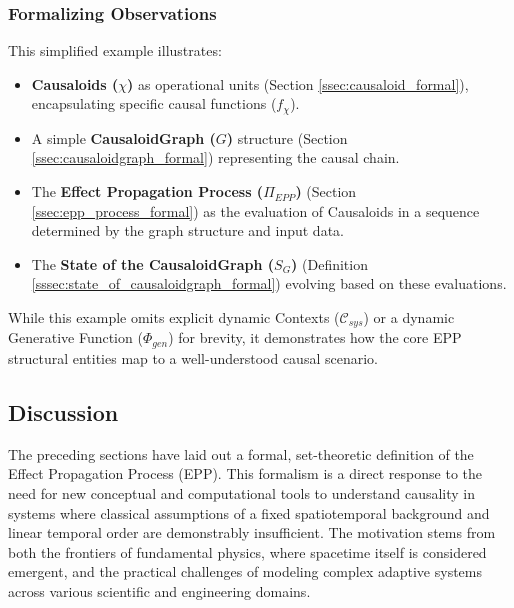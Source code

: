     \subsubsection{Formalizing Observations}
    \label{ssec:example_observations_connection}
    This simplified example illustrates:
    \begin{itemize}
        \item \textbf{Causaloids (\(\chi\))} as operational units (Section \ref{ssec:causaloid_formal}), encapsulating specific causal functions (\(f_\chi\)).
        \item A simple \textbf{CausaloidGraph (\(G\))} structure (Section \ref{ssec:causaloidgraph_formal}) representing the causal chain.
        \item The \textbf{Effect Propagation Process (\(\Pi_{EPP}\))} (Section \ref{ssec:epp_process_formal}) as the evaluation of Causaloids in a sequence determined by the graph structure and input data.
        \item The \textbf{State of the CausaloidGraph (\(S_G\))} (Definition \ref{sssec:state_of_causaloidgraph_formal}) evolving based on these evaluations.
    \end{itemize}
    While this example omits explicit dynamic Contexts (\(\mathcal{C}_{sys}\)) or a dynamic Generative Function (\(\Phi_{gen}\)) for brevity, it demonstrates how the core EPP structural entities map to a well-understood causal scenario.
    
    
\subsection[Discussion]{Discussion} 
\label{sec:formalization_example_discussion}

The preceding sections have laid out a formal, set-theoretic definition of the Effect Propagation Process (EPP). This formalism is a direct response to the need for new conceptual and computational tools to understand causality in systems where classical assumptions of a fixed spatiotemporal background and linear temporal order are demonstrably insufficient. The motivation stems from both the frontiers of fundamental physics, where spacetime itself is considered emergent, and the practical challenges of modeling complex adaptive systems across various scientific and engineering domains.

